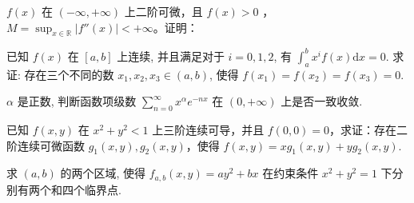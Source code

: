 $f(x)$ 在 $(- \infty, + \infty)$ 上二阶可微，且 $f(x) > 0$ ，$M = \sup_{x \in \mathbb{R}} |f''(x)| < + \infty$。证明：\par
\nopagebreak[4]
已知 $f(x)$ 在 $[a, b]$ 上连续, 并且满足对于 $i = 0, 1, 2$, 有 $\int_{a}^{b} x^{i} f(x) \mathrm{d}x = 0$. 求证: 存在三个不同的数 $x_{1}, x_{2}, x_{3} \in (a, b)$, 使得 $f(x_{1}) = f(x_{2}) = f(x_{3}) = 0$.\par
$\alpha$ 是正数, 判断函数项级数 $\sum_{n=0}^{\infty} x^{\alpha} e^{-nx}$ 在 $(0, +\infty)$ 上是否一致收敛.\par
已知 $f(x, y)$ 在 $x^2 + y^2 < 1$ 上三阶连续可导，并且 $f(0, 0) = 0$，求证：存在二阶连续可微函数 $g_1(x, y), g_2(x, y)$，使得 $f(x, y) = xg_1(x, y) + yg_2(x, y)$.\par
求 $(a, b)$ 的两个区域, 使得 $f_{a, b}(x, y) = ay^2 + bx$ 在约束条件 $x^2 + y^2 = 1$ 下分别有两个和四个临界点.\par
